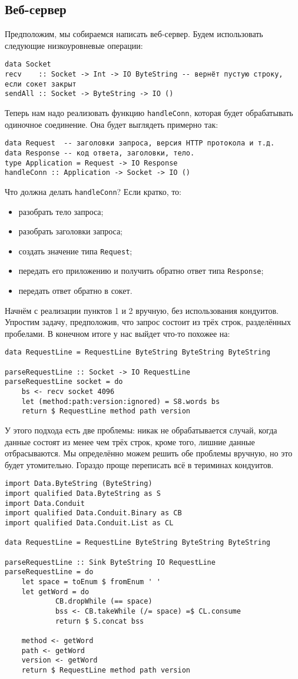 \subsection{Веб-сервер}
Предположим, мы собираемся написать веб-сервер. Будем использовать следующие низкоуровневые операции:
\begin{lstlisting}
data Socket
recv    :: Socket -> Int -> IO ByteString -- вернёт пустую строку, если сокет закрыт
sendAll :: Socket -> ByteString -> IO ()
\end{lstlisting}
Теперь нам надо реализовать функцию \lstinline'handleConn', которая будет обрабатывать
одиночное соединение. Она будет выглядеть примерно так:
\begin{lstlisting}
data Request  -- заголовки запроса, версия HTTP протокола и т.д.
data Response -- код ответа, заголовки, тело.
type Application = Request -> IO Response
handleConn :: Application -> Socket -> IO ()
\end{lstlisting}
Что должна делать \lstinline'handleConn'? Если кратко, то:
\begin{itemize}
\item   разобрать тело запроса;
\item   разобрать заголовки запроса;
\item   создать значение типа \lstinline'Request';
\item   передать его приложению и получить обратно ответ типа \lstinline'Response';
\item   передать ответ обратно в сокет.
\end{itemize}
Начнём с реализации пунктов 1 и 2 вручную, без использования кондуитов. Упростим задачу, предположив, что
запрос состоит из трёх строк, разделённых пробелами.
В конечном итоге у нас выйдет что-то похожее на:
\begin{lstlisting}
data RequestLine = RequestLine ByteString ByteString ByteString

parseRequestLine :: Socket -> IO RequestLine
parseRequestLine socket = do
    bs <- recv socket 4096
    let (method:path:version:ignored) = S8.words bs
    return $ RequestLine method path version
\end{lstlisting}
У этого подхода есть две проблемы: никак не обрабатывается случай, когда данные состоят из менее чем
трёх строк, кроме того, лишние данные отбрасываются. Мы определённо можем решить обе
проблемы вручную, но это будет утомительно. Гораздо проще переписать всё
в териминах кондуитов.
\begin{lstlisting}
import Data.ByteString (ByteString)
import qualified Data.ByteString as S
import Data.Conduit
import qualified Data.Conduit.Binary as CB
import qualified Data.Conduit.List as CL

data RequestLine = RequestLine ByteString ByteString ByteString

parseRequestLine :: Sink ByteString IO RequestLine
parseRequestLine = do
    let space = toEnum $ fromEnum ' '
    let getWord = do
            CB.dropWhile (== space)
            bss <- CB.takeWhile (/= space) =$ CL.consume
            return $ S.concat bss

    method <- getWord
    path <- getWord
    version <- getWord
    return $ RequestLine method path version
\end{lstlisting}

